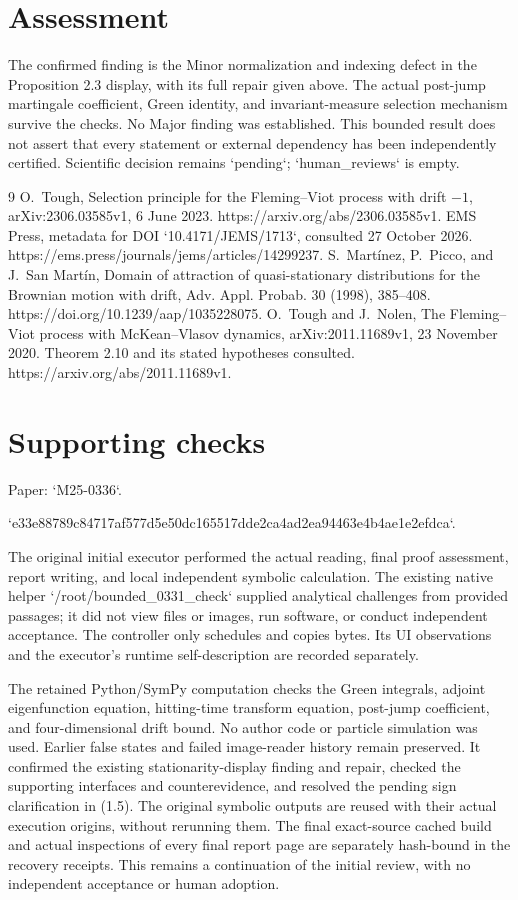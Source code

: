 \documentclass[10pt]{article}
\begin{document}
\section*{Assessment}
The confirmed finding is the Minor normalization and indexing defect in the Proposition 2.3 display, with its full repair given above. The actual post-jump martingale coefficient, Green identity, and invariant-measure selection mechanism survive the checks. No Major finding was established. This bounded result does not assert that every statement or external dependency has been independently certified. Scientific decision remains `pending`; `human\_reviews` is empty.\par
9 O. Tough, Selection principle for the Fleming–Viot process with drift \(-1\), arXiv:2306.03585v1, 6 June 2023. https://arxiv.org/abs/2306.03585v1. EMS Press, metadata for DOI `10.4171/JEMS/1713`, consulted 27 October 2026. https://ems.press/journals/jems/articles/14299237. S. Martínez, P. Picco, and J. San Martín, Domain of attraction of quasi-stationary distributions for the Brownian motion with drift, Adv. Appl. Probab. 30 (1998), 385–408. https://doi.org/10.1239/aap/1035228075. O. Tough and J. Nolen, The Fleming–Viot process with McKean–Vlasov dynamics, arXiv:2011.11689v1, 23 November 2020. Theorem 2.10 and its stated hypotheses consulted. https://arxiv.org/abs/2011.11689v1.\par
\section*{Supporting checks}
Paper: `M25-0336`.\par
`e33e88789c84717af577d5e50dc165517dde2ca4ad2ea94463e4b4ae1e2efdca`.\par
The original initial executor performed the actual reading, final proof assessment, report writing, and local independent symbolic calculation. The existing native helper `/root/bounded\_0331\_check` supplied analytical challenges from provided passages; it did not view files or images, run software, or conduct independent acceptance. The controller only schedules and copies bytes. Its UI observations and the executor’s runtime self-description are recorded separately.\par
The retained Python/SymPy computation checks the Green integrals, adjoint eigenfunction equation, hitting-time transform equation, post-jump coefficient, and four-dimensional drift bound. No author code or particle simulation was used. Earlier false states and failed image-reader history remain preserved. It confirmed the existing stationarity-display finding and repair, checked the supporting interfaces and counterevidence, and resolved the pending sign clarification in (1.5). The original symbolic outputs are reused with their actual execution origins, without rerunning them. The final exact-source cached build and actual inspections of every final report page are separately hash-bound in the recovery receipts. This remains a continuation of the initial review, with no independent acceptance or human adoption.\par
\end{document}
